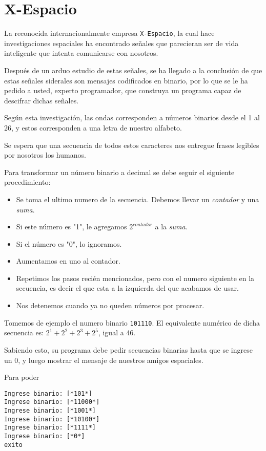 
\section{X-Espacio}

La reconocida internacionalmente empresa \texttt{X-Espacio}, la cual hace investigaciones espaciales ha encontrado señales que parecieran ser de vida inteligente que intenta comunicarse con nosotros.

Después de un arduo estudio de estas señales, se ha llegado a la conclusión de que estas señales siderales son mensajes codificados en binario, por lo que se le ha pedido a usted, experto programador, que construya un programa capaz de descifrar dichas señales.

Según esta investigación, las ondas corresponden a números binarios desde el 1 al 26, y estos corresponden a una letra de nuestro alfabeto.

Se espera que una secuencia de todos estos caracteres nos entregue frases legibles por nosotros los humanos.

Para transformar un número binario a decimal se debe seguir el siguiente procedimiento:

\begin{itemize}
    \item Se toma el ultimo numero de la secuencia. Debemos llevar un \textit{contador} y una \textit{suma}.
    \item Si este número es "1", le agregamos $2^{contador}$ a la \textit{suma}.
    \item Si el número es "0", lo ignoramos.
    \item Aumentamos en uno al contador.
    \item Repetimos los pasos recién mencionados, pero con el numero siguiente en la secuencia, es decir el que esta a la izquierda del que acabamos de usar.
    \item Nos detenemos cuando ya no queden números por procesar.
\end{itemize}

Tomemos de ejemplo el numero binario \texttt{101110}. El equivalente numérico de dicha secuencia es: $2^{1} + 2^{2} + 2^{3} + 2^{5}$, igual a 46.

Sabiendo esto, su programa debe pedir secuencias binarias hasta que se ingrese un 0, y luego mostrar el mensaje de nuestros amigos espaciales.

Para poder 

\begin{lstlisting}[style=consola]
Ingrese binario: [*101*]
Ingrese binario: [*11000*]
Ingrese binario: [*1001*]
Ingrese binario: [*10100*]
Ingrese binario: [*1111*]
Ingrese binario: [*0*]
exito
\end{lstlisting}